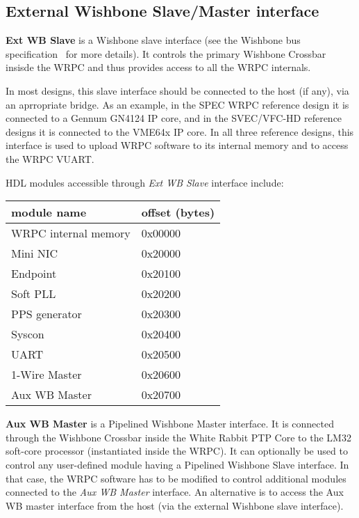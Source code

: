 \subsection{External Wishbone Slave/Master interface}
\label{sec:wrpc_wb}


{\bf Ext WB Slave} is a Wishbone slave interface (see the Wishbone bus specification~\cite{wb_spec}
for more details). It controls the primary Wishbone Crossbar insisde the WRPC and thus provides
access to all the WRPC internals.

In most designs, this slave interface should be connected to the host (if any), via an aprropriate
bridge. As an example, in the SPEC WRPC reference design it is connected to a Gennum GN4124 IP core,
and in the SVEC/VFC-HD reference designs it is connected to the VME64x IP core.  In all three
reference designs, this interface is used to upload WRPC software to its internal memory and to
access the WRPC VUART.

HDL modules accessible through \emph{Ext WB Slave} interface include:
\begin{center}
  \begin{tabular}{|l|l|}
    \hline {\bf module name} & {\bf offset (bytes)}\\
    \hline
    WRPC internal memory & 0x00000\\
                Mini NIC & 0x20000\\
                Endpoint & 0x20100\\
                Soft PLL & 0x20200\\
           PPS generator & 0x20300\\
                  Syscon & 0x20400\\
                    UART & 0x20500\\
           1-Wire Master & 0x20600\\
           Aux WB Master & 0x20700\\
    \hline
  \end{tabular}
\end{center}

{\bf Aux WB Master} is a Pipelined Wishbone Master interface. It is connected through the Wishbone
Crossbar inside the White Rabbit PTP Core to the LM32 soft-core processor (instantiated inside the
WRPC). It can optionally be used to control any user-defined module having a Pipelined Wishbone
Slave interface. In that case, the WRPC software has to be modified to control additional modules
connected to the \emph{Aux WB Master} interface. An alternative is to access the Aux WB master
interface from the host (via the external Wishbone slave interface).

